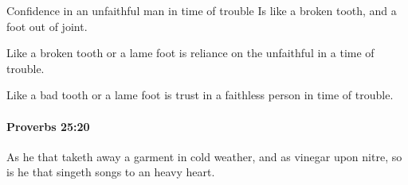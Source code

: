 			\begin{versebox}
					\item[BHS] 
					\item[ASV] Confidence in an unfaithful man in time of trouble Is like a broken tooth, and a foot out of joint.
					\item[NIV] Like a broken tooth or a lame foot is reliance on the unfaithful in a time of trouble.
					\item[NRSV] Like a bad tooth or a lame foot is trust in a faithless person in time of trouble.
			\end{versebox}

		\paragraph{Proverbs 25:20} %
			\label{PROVERBS-25-20}

			As he that taketh away a garment in cold weather, and as vinegar upon nitre, so is he that singeth songs to an heavy heart.

